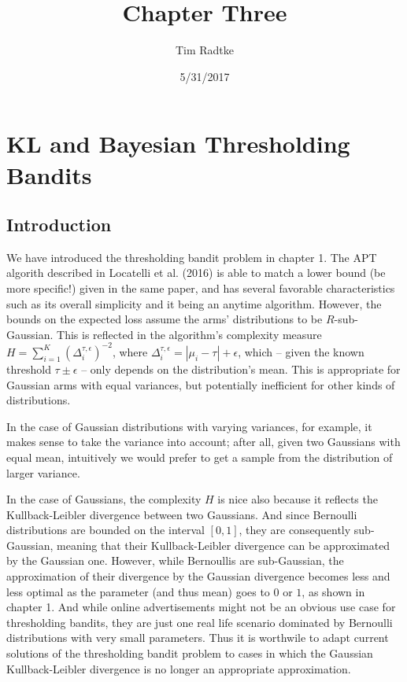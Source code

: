 \documentclass[12pt,]{article}
\title{Chapter Three}
\author{Tim Radtke}
\date{5/31/2017}
\begin{document}
\maketitle

{
\hypersetup{linkcolor=black}
\setcounter{tocdepth}{3}
\tableofcontents
}
\section{KL and Bayesian Thresholding
Bandits}\label{kl-and-bayesian-thresholding-bandits}

\subsection{Introduction}\label{introduction}

We have introduced the thresholding bandit problem in chapter 1. The APT
algorith described in Locatelli et al. (2016) is able to match a lower
bound (be more specific!) given in the same paper, and has several
favorable characteristics such as its overall simplicity and it being an
anytime algorithm. However, the bounds on the expected loss assume the
arms' distributions to be \(R\)-sub-Gaussian. This is reflected in the
algorithm's complexity measure
\(H = \sum_{i=1}^K (\Delta_i^{\tau, \epsilon})^{-2}\), where
\(\Delta_i^{\tau,\epsilon} = |\mu_i - \tau| + \epsilon\), which -- given
the known threshold \(\tau \pm \epsilon\) -- only depends on the
distribution's mean. This is appropriate for Gaussian arms with equal
variances, but potentially inefficient for other kinds of distributions.

In the case of Gaussian distributions with varying variances, for
example, it makes sense to take the variance into account; after all,
given two Gaussians with equal mean, intuitively we would prefer to get
a sample from the distribution of larger variance.

In the case of Gaussians, the complexity \(H\) is nice also because it
reflects the Kullback-Leibler divergence between two Gaussians. And
since Bernoulli distributions are bounded on the interval \([0,1]\),
they are consequently sub-Gaussian, meaning that their Kullback-Leibler
divergence can be approximated by the Gaussian one. However, while
Bernoullis are sub-Gaussian, the approximation of their divergence by
the Gaussian divergence becomes less and less optimal as the parameter
(and thus mean) goes to \(0\) or \(1\), as shown in chapter 1. And while
online advertisements might not be an obvious use case for thresholding
bandits, they are just one real life scenario dominated by Bernoulli
distributions with very small parameters. Thus it is worthwile to adapt
current solutions of the thresholding bandit problem to cases in which
the Gaussian Kullback-Leibler divergence is no longer an appropriate
approximation.
\end{document}
